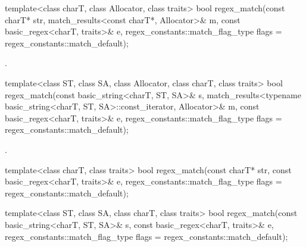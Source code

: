 %
\begin{itemdecl}
template<class charT, class Allocator, class traits>
  bool regex_match(const charT* str,
                   match_results<const charT*, Allocator>& m,
                   const basic_regex<charT, traits>& e,
                   regex_constants::match_flag_type flags = regex_constants::match_default);
\end{itemdecl}

\begin{itemdescr}
\pnum
\returns
{}.
\end{itemdescr}

%
\begin{itemdecl}
template<class ST, class SA, class Allocator, class charT, class traits>
  bool regex_match(const basic_string<charT, ST, SA>& s,
                   match_results<typename basic_string<charT, ST, SA>::const_iterator,
                                 Allocator>& m,
                   const basic_regex<charT, traits>& e,
                   regex_constants::match_flag_type flags = regex_constants::match_default);
\end{itemdecl}

\begin{itemdescr}
\pnum
\returns
{}.
\end{itemdescr}

%
\begin{itemdecl}
template<class charT, class traits>
  bool regex_match(const charT* str,
                   const basic_regex<charT, traits>& e,
                   regex_constants::match_flag_type flags = regex_constants::match_default);
\end{itemdecl}

\begin{itemdescr}
\pnum
\returns
{}
\end{itemdescr}

%
\begin{itemdecl}
template<class ST, class SA, class charT, class traits>
  bool regex_match(const basic_string<charT, ST, SA>& s,
                   const basic_regex<charT, traits>& e,
                   regex_constants::match_flag_type flags = regex_constants::match_default);
\end{itemdecl}

